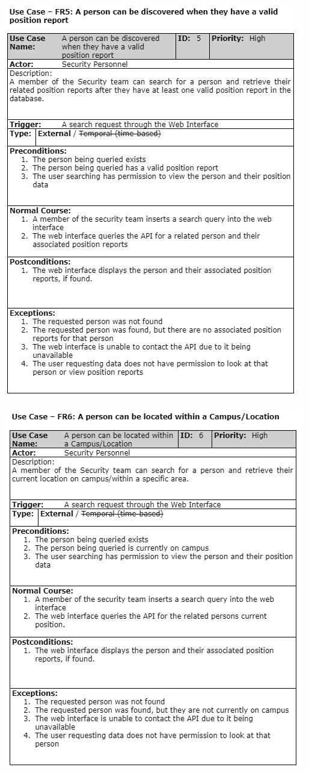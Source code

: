 \documentclass[
  english,
  a4paper,
,tablecaptionabove
]{scrartcl}
\begin{document}
\includegraphics{images/ppm-images/use-case-5.png} \newpage

\includegraphics{images/ppm-images/use-case-6.png} \newpage
\end{document}
